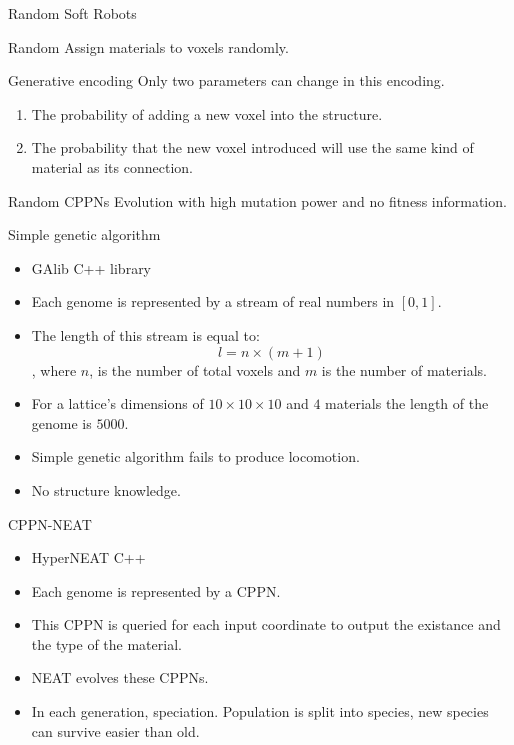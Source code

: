 \documentclass{beamer}
\begin{document}
\begin{frame}{Random Soft Robots}
\begin{block}{Random}
Assign materials to voxels randomly.
\end{block}
\begin{block}{Generative encoding}
Only two parameters can change in this encoding.
\begin{enumerate}
\item The probability of adding a new voxel into the structure.
\item The probability that the new voxel introduced will use the same kind of material as its connection.
\end{enumerate}
\end{block}
\begin{block}{Random CPPNs}
Evolution with high mutation power and no fitness information.
\end{block}
\end{frame}

\begin{frame}{Simple genetic algorithm}
\begin{itemize}
\item GAlib C++ library
\item Each genome is represented by a stream of real numbers in $[ 0,1 ]$.
\item The length of this stream is equal to:
\begin{equation*}
l = n \times (m + 1)
\end{equation*}
, where $n$, is the number of total voxels and $m$ is the number of materials.
\item For a lattice's dimensions of $10 \times 10 \times 10$ and $4$ materials the length of the genome is $5000$.
\item Simple genetic algorithm fails to produce locomotion.
\item No structure knowledge.
\end{itemize}
\end{frame}


\begin{frame}{CPPN-NEAT}
\begin{itemize}
\item HyperNEAT C++
\item Each genome is represented by a CPPN.
\item This CPPN is queried for each input coordinate to output the existance and the type of the material.
\item NEAT evolves these CPPNs.
\item In each generation, speciation. Population is split into species, new species can survive easier than old.
\end{itemize}
\end{frame}
\end{document}
